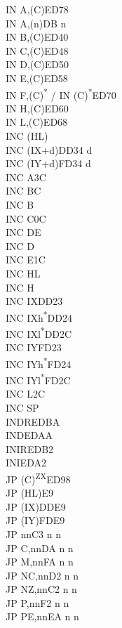 \documentclass[twoside,openright,a4paper]{book}
\begin{document}
\begin{multicols}{3}
{\begin{tabbing}
	IN A,(C)\>ED78\\
	IN A,(n)\>DB n\\
	IN B,(C)\>ED40\\
	IN C,(C)\>ED48\\
	IN D,(C)\>ED50\\
	IN E,(C)\>ED58\\
	IN F,(C)\textsuperscript{*} / IN (C)\textsuperscript{*}\>ED70\\
	IN H,(C)\>ED60\\
	IN L,(C)\>ED68\\
	INC (HL)\\
	INC (IX+d)\>DD34 d\\
	INC (IY+d)\>FD34 d\\
	INC A\>3C\\
	INC BC\\
	INC B\\
	INC C\>0C\\
	INC DE\\
	INC D\\
	INC E\>1C\\
	INC HL\\
	INC H\\
	INC IX\>DD23\\
	INC IXh\textsuperscript{*}\>DD24\\
	INC IXl\textsuperscript{*}\>DD2C\\
	INC IY\>FD23\\
	INC IYh\textsuperscript{*}\>FD24\\
	INC IYl\textsuperscript{*}\>FD2C\\
	INC L\>2C\\
	INC SP\\
	INDR\>EDBA\\
	IND\>EDAA\\
	INIR\>EDB2\\
	INI\>EDA2\\
	JP (C)\textsuperscript{ZX}\>ED98\\
	JP (HL)\>E9\\
	JP (IX)\>DDE9\\
	JP (IY)\>FDE9\\
	JP nn\>C3 n n\\
	JP C,nn\>DA n n\\
	JP M,nn\>FA n n\\
	JP NC,nn\>D2 n n\\
	JP NZ,nn\>C2 n n\\
	JP P,nn\>F2 n n\\
	JP PE,nn\>EA n n\\

\end{tabbing}}
\end{multicols}
\end{document}
